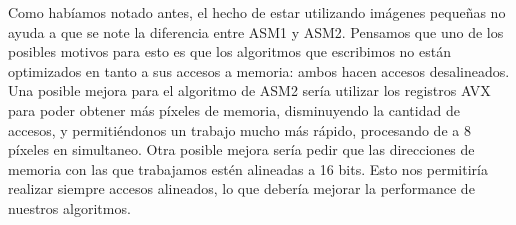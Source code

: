 Como habíamos notado antes, el hecho de estar utilizando imágenes pequeñas no ayuda a que se note la diferencia entre ASM1 y ASM2. Pensamos que uno de los posibles motivos para esto es que los algoritmos que escribimos no están optimizados en tanto a sus accesos a memoria: ambos hacen accesos desalineados. Una posible mejora para el algoritmo de ASM2 sería utilizar los registros AVX para poder obtener más píxeles de memoria, disminuyendo la cantidad de accesos, y permitiéndonos un trabajo mucho más rápido, procesando de a 8 píxeles en simultaneo. Otra posible mejora sería pedir que las direcciones de memoria con las que trabajamos estén alineadas a 16 bits. Esto nos permitiría realizar siempre accesos alineados, lo que debería mejorar la performance de nuestros algoritmos.



